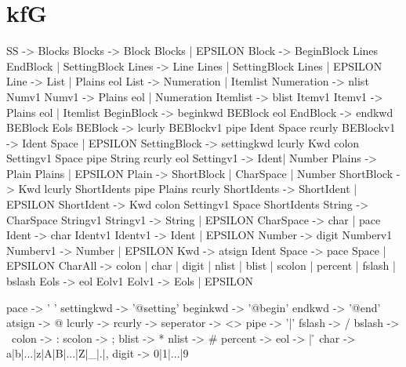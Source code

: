 \section{kfG}
\label{AkfG}
\begin{spverbatim}
SS           -> Blocks 
Blocks       -> Block Blocks | EPSILON 
Block        -> BeginBlock Lines EndBlock | SettingBlock
Lines        -> Line Lines | SettingBlock Lines | EPSILON 
Line         -> List | Plains eol
List         -> Numeration | Itemlist 
Numeration   -> nlist Numv1 
Numv1        -> Plains eol | Numeration 
Itemlist     -> blist Itemv1 
Itemv1       -> Plains eol | Itemlist 
BeginBlock   -> beginkwd BEBlock eol
EndBlock     -> endkwd BEBlock Eols
BEBlock      -> lcurly BEBlockv1 pipe Ident Space  rcurly
BEBlockv1    -> Ident Space | EPSILON
SettingBlock -> settingkwd lcurly Kwd colon Settingv1 Space pipe String rcurly eol
Settingv1    -> Ident| Number
Plains       -> Plain Plains | EPSILON
Plain        -> ShortBlock | CharSpace | Number
ShortBlock   -> Kwd lcurly ShortIdents pipe Plains rcurly
ShortIdents  -> ShortIdent | EPSILON 
ShortIdent   -> Kwd colon Settingv1 Space ShortIdents
String       -> CharSpace Stringv1
Stringv1     -> String  | EPSILON
CharSpace    -> char | pace
Ident        -> char Identv1
Identv1      -> Ident | EPSILON
Number       -> digit Numberv1
Numberv1     -> Number | EPSILON
Kwd          -> atsign Ident
Space        -> pace Space | EPSILON
CharAll      -> colon | char | digit | nlist | blist | scolon | percent | fslash | bslash
Eols         -> eol Eolv1
Eolv1        -> Eols | EPSILON



pace       -> ' ' 
settingkwd -> '@setting'
beginkwd   -> '@begin'
endkwd     -> '@end' 
atsign     -> @
lcurly     -> { 
rcurly     -> } 
seperator  -> <> 
pipe       -> '|' 
fslash     -> /
bslash     -> \
colon      -> : 
scolon     -> ; 
blist      -> * 
nlist      -> # 
percent    -> %
eol        -> \n | \r\n 
char       -> a|b|...|z|A|B|...|Z|_|.|,
digit      -> 0|1|...|9
\end{spverbatim}